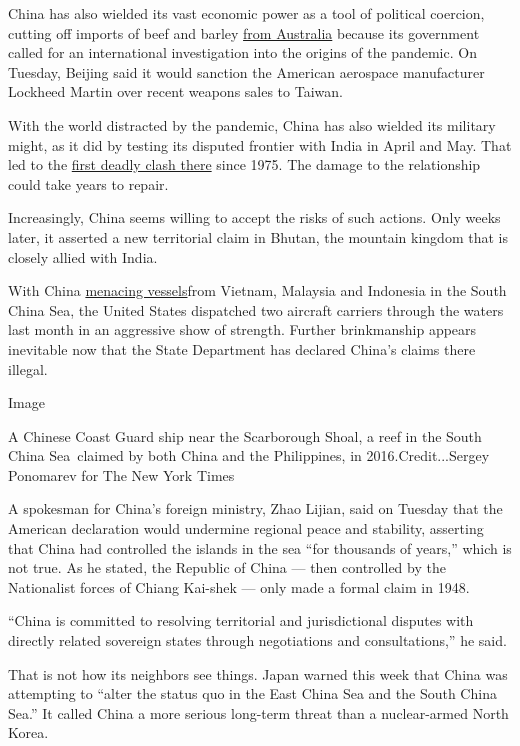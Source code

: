 China has also wielded its vast economic power as a tool of political
coercion, cutting off imports of beef and barley
\href{https://www.nytimes3xbfgragh.onion/2020/06/30/world/australia/cyber-defense-china-hacking.html}{from
Australia} because its government called for an international
investigation into the origins of the pandemic. On Tuesday, Beijing said
it would sanction the American aerospace manufacturer Lockheed Martin
over recent weapons sales to Taiwan.

With the world distracted by the pandemic, China has also wielded its
military might, as it did by testing its disputed frontier with India in
April and May. That led to the
\href{https://www.nytimes3xbfgragh.onion/2020/06/17/world/asia/china-india-border.html}{first
deadly clash there} since 1975. The damage to the relationship could
take years to repair.

Increasingly, China seems willing to accept the risks of such actions.
Only weeks later, it asserted a new territorial claim in Bhutan, the
mountain kingdom that is closely allied with India.

With China
\href{https://www.nytimes3xbfgragh.onion/2020/05/24/world/asia/china-hong-kong-taiwan.html}{menacing
vessels}from Vietnam, Malaysia and Indonesia in the South China Sea, the
United States dispatched two aircraft carriers through the waters last
month in an aggressive show of strength. Further brinkmanship appears
inevitable now that the State Department has declared China's claims
there illegal.

Image

A Chinese Coast Guard ship near the Scarborough Shoal, a reef in the
South China Sea~claimed by both China and the Philippines, in
2016.Credit...Sergey Ponomarev for The New York Times

A spokesman for China's foreign ministry, Zhao Lijian, said on Tuesday
that the American declaration would undermine regional peace and
stability, asserting that China had controlled the islands in the sea
``for thousands of years,'' which is not true. As he stated, the
Republic of China --- then controlled by the Nationalist forces of
Chiang Kai-shek --- only made a formal claim in 1948.

``China is committed to resolving territorial and jurisdictional
disputes with directly related sovereign states through negotiations and
consultations,'' he said.

That is not how its neighbors see things. Japan warned this week that
China was attempting to ``alter the status quo in the East China Sea and
the South China Sea.'' It called China a more serious long-term threat
than a nuclear-armed North Korea.

